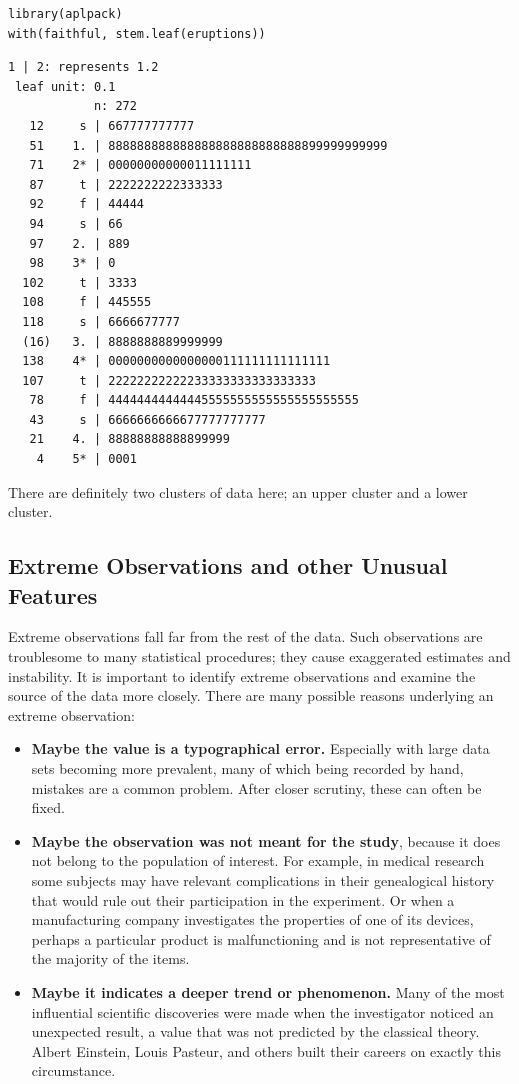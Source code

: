 \documentclass[captions=tableheading]{scrbook}
\begin{document}
\begin{verbatim}
library(aplpack)
with(faithful, stem.leaf(eruptions))
\end{verbatim}


\begin{verbatim}
1 | 2: represents 1.2
 leaf unit: 0.1
            n: 272
   12     s | 667777777777
   51    1. | 888888888888888888888888888899999999999
   71    2* | 00000000000011111111
   87     t | 2222222222333333
   92     f | 44444
   94     s | 66
   97    2. | 889
   98    3* | 0
  102     t | 3333
  108     f | 445555
  118     s | 6666677777
  (16)   3. | 8888888889999999
  138    4* | 0000000000000000111111111111111
  107     t | 22222222222233333333333333333
   78     f | 44444444444445555555555555555555555
   43     s | 6666666666677777777777
   21    4. | 88888888888899999
    4    5* | 0001
\end{verbatim}

There are definitely two clusters of data here; an upper cluster and a lower cluster. 
\subsection{Extreme Observations and other Unusual Features}
\label{sec-3-2-5}
\label{sub-Extreme-Observations-and}


Extreme observations fall far from the rest of the data. Such observations are troublesome to many statistical procedures; they cause exaggerated estimates and instability. It is important to identify extreme observations and examine the source of the data more closely. There are many possible reasons underlying an extreme observation:

\begin{itemize}
\item \textbf{Maybe the value is a typographical error.} Especially with large data sets becoming more prevalent, many of which being recorded by hand, mistakes are a common problem. After closer scrutiny, these can often be fixed.
\item \textbf{Maybe the observation was not meant for the study}, because it does not belong to the population of interest. For example, in medical research some subjects may have relevant complications in their genealogical history that would rule out their participation in the experiment. Or when a manufacturing company investigates the properties of one of its devices, perhaps a particular product is malfunctioning and is not representative of the majority of the items.
\item \textbf{Maybe it indicates a deeper trend or phenomenon.} Many of the most influential scientific discoveries were made when the investigator noticed an unexpected result, a value that was not predicted by the classical theory. Albert Einstein, Louis Pasteur, and others built their careers on exactly this circumstance.
\end{itemize}
\end{document}
